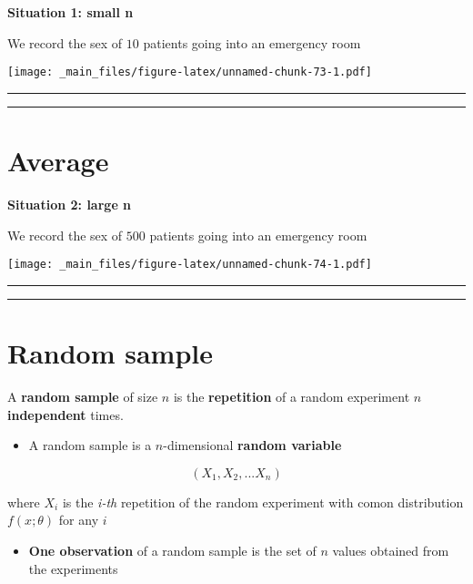 \documentclass[
]{book}
\providecommand{\tightlist}{%
  \setlength{\itemsep}{0pt}\setlength{\parskip}{0pt}}
\begin{document}
\textbf{Situation 1: small n}

We record the sex of \(10\) patients going into an emergency room

\texttt{[image: \_main\_files/figure-latex/unnamed-chunk-73-1.pdf]}

\begin{center}\rule{0.5\linewidth}{0.5pt}\end{center}

\begin{center}\rule{0.5\linewidth}{0.5pt}\end{center}

\hypertarget{average-7}{%
\section{Average}\label{average-7}}

\textbf{Situation 2: large n}

We record the sex of \(500\) patients going into an emergency room

\texttt{[image: \_main\_files/figure-latex/unnamed-chunk-74-1.pdf]}

\begin{center}\rule{0.5\linewidth}{0.5pt}\end{center}

\begin{center}\rule{0.5\linewidth}{0.5pt}\end{center}

\hypertarget{random-sample-1}{%
\section{Random sample}\label{random-sample-1}}

A \textbf{random sample} of size \(n\) is the \textbf{repetition} of a random experiment \(n\) \textbf{independent} times.

\begin{itemize}
\tightlist
\item
  A random sample is a \(n\)-dimensional \textbf{random variable}
\end{itemize}

\[(X_1, X_2, ... X_n)\]

where \(X_i\) is the \emph{i-th} repetition of the random experiment with comon distribution \(f(x; \theta)\) for any \(i\)

\begin{itemize}
\tightlist
\item
  \textbf{One observation} of a random sample is the set of \(n\) values obtained from the experiments
\end{itemize}
\end{document}
